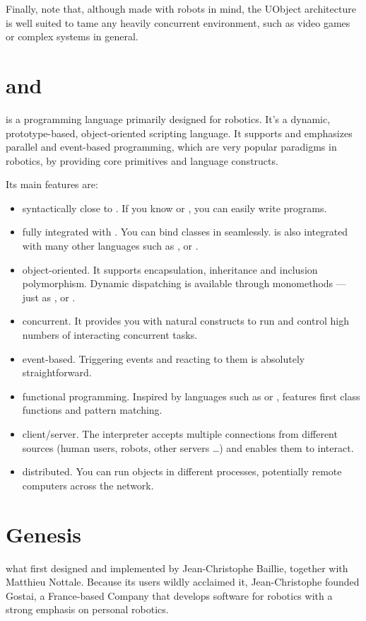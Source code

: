 Finally, note that, although made with robots in mind, the UObject
architecture is well suited to tame any heavily concurrent
environment, such as video games or complex systems in general.

\section{\urbi and \us}

\us is a programming language primarily designed for robotics. It's a
dynamic, prototype-based, object-oriented scripting language. It
supports and emphasizes parallel and event-based programming, which
are very popular paradigms in robotics, by providing core primitives
and language constructs.

Its main features are:
\begin{itemize}
\item syntactically close to \Cxx. If you know \C or \Cxx, you can
  easily write \us programs.
\item fully integrated with \Cxx. You can bind \Cxx classes in \us
  seamlessly. \us is also integrated with many other languages such as
  \Java, \MatLab or \Python.
\item object-oriented. It supports encapsulation, inheritance and
  inclusion polymorphism. Dynamic dispatching is available through
  monomethods --- just as \Cxx, \Cs or \Java.
\item concurrent. It provides you with natural constructs to run and
  control high numbers of interacting concurrent tasks.
\item event-based. Triggering events and reacting to them is
  absolutely straightforward.
\item functional programming.  Inspired by languages such as \Lisp or
  \Caml, \us features first class functions and pattern matching.
\item client/server.  The interpreter accepts multiple connections
  from different sources (human users, robots, other servers \ldots)
  and enables them to interact.
\item distributed.  You can run objects in different processes,
  potentially remote computers across the network.
\end{itemize}

\section{Genesis}

\urbi what first designed and implemented by Jean-Christophe Baillie,
together with Matthieu Nottale.  Because its users wildly acclaimed it,
Jean-Christophe founded Gostai, a France-based Company that develops
software for robotics with a strong emphasis on personal robotics.

